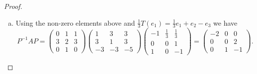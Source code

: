 \documentclass[10pt]{amsart}
\begin{document}
\begin{thm}
\begin{proof}
\begin{enumerate}[(a)]
    \item
      Using the non-zero elements above and $\frac{1}{3}T(e_1) = \frac{1}{3}e_1 + e_2 - e_3$ we have
      $$P^{-1}AP = \left(
      \begin{array}{ccc}
        0 & 1 & 1\\
        3 & 2 & 3\\
        0 & 1 & 0
      \end{array}
      \right)
      \left(
      \begin{array}{ccc}
        1 & 3 & 3\\
        3 & 1 & 3\\
        -3 & -3 & -5
      \end{array}
      \right)
      \left(
      \begin{array}{ccc}
        -1 & \frac{1}{3} & \frac{1}{3}\\
        0 &  0 & 1\\
        1 & 0 & -1
      \end{array}
      \right) = 
      \left(
      \begin{array}{ccc}
        -2 & 0 & 0\\
        0 & 0 & 2\\
        0 & 1 & -1
      \end{array}
      \right).$$
    \end{enumerate}
  \end{proof}
\end{thm}  
\end{document}
